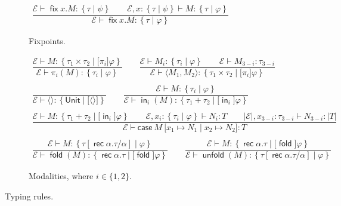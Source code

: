 \documentclass[%
  a4paper,
  UKenglish,
  cleveref,
  autoref,
  thm-restate,
  numberwithinsect,
]{lipics-v2021}
\newcommand\thesis{\vdash}
\newcommand\pair[1]{{\langle #1\rangle}}
\newcommand\copair[1]{{\lbrack #1 \rbrack}}
\newcommand\Env{\mathcal{E}}    %
\newcommand\term[1]{\mathsf{#1}}
\newcommand\type[1]{\term{#1}}
\newcommand\cse{\term{case}}
\newcommand\inj{\mathop{\term{in}}}
\newcommand\fix{\mathop{\term{fix}}}
\newcommand\fold{\mathop{\term{fold}}}
\newcommand\unfold{\mathop{\term{unfold}}}
\newcommand\Unit{\type{Unit}}
\newcommand\rec{\mathop{\type{rec}}}	%
\newcommand\TV{\alpha}		%
\newcommand\reft[1]{\left\{ #1 \right\}}
\newcommand\PT{\tau}		%
\newcommand\RT{T}               %
\newcommand\UPT[1]{\vert #1 \vert}        %
\newcommand\form[1]{\lbrack #1 \rbrack}
\begin{document}
\begin{figure}[t!]
\begin{subfigure}{\textwidth}
\centering
\(
\begin{array}{c}
%
\dfrac{\Env \thesis \fix x.M \colon \reft{\PT \mid \psi}
  \qquad
  \Env, x\colon \reft{\PT \mid \psi} \thesis M \colon \reft{\PT \mid \varphi}}
  {\Env \thesis \fix x.M \colon \reft{\PT \mid \varphi}}
%
\end{array}
\)
\caption{Fixpoints.%
\label{fig:reft:fix}}
\end{subfigure}

\begin{subfigure}{\textwidth}
\centering
\(
\begin{array}{c}
%
\dfrac{\Env \thesis M \colon \reft{\PT_1 \times \PT_2 \mid \form{\pi_i} \varphi}}
  {\Env \thesis \pi_i(M) \colon \reft{\PT_i \mid \varphi}}
%
\qquad
%
\dfrac{\Env \thesis M_i \colon \reft{\PT_i \mid \varphi}
  \qquad
  \Env \thesis M_{3-i} \colon \PT_{3-i}}
  {\Env \thesis \pair{M_1,M_2} \colon \reft{\PT_1 \times \PT_2 \mid \form{\pi_i} \varphi}}
%
\\\\
%
\dfrac{}
  {\Env \thesis \pair{} \colon \reft{\Unit \mid \form{\pair{}}}}
%
\qquad
%
\dfrac{\Env \thesis M \colon \reft{\PT_i \mid \varphi}}
  {\Env \thesis \inj_i(M) \colon \reft{\PT_1 + \PT_2 \mid \form{\inj_i} \varphi}}
%
\\\\
%
\dfrac{
  \Env \thesis M \colon \reft{\PT_1 + \PT_2 \mid \form{\inj_i}\varphi}
  \qquad
  \Env, x_i \colon \reft{\PT_i \mid \varphi} \thesis N_i \colon \RT
  \qquad
  \UPT\Env, x_{3-i} \colon \PT_{3-i} \thesis N_{3-i} \colon \UPT\RT}
  {\Env \thesis \cse\ M\ \copair{x_1 \mapsto N_1 \mid x_2 \mapsto N_2} \colon \RT}
%
\\\\
%
\dfrac{\Env \thesis M \colon \reft{\PT[\rec\TV.\PT/\TV] \mid \varphi}}
  {\Env \thesis \fold(M) \colon \reft{\rec\TV.\PT \mid \form\fold \varphi}}
%
\qquad
%
\dfrac{\Env \thesis M \colon \reft{\rec\TV.\PT \mid \form\fold \varphi}}
  {\Env \thesis \unfold(M) \colon \reft{\PT[\rec\TV.\PT/\TV] \mid \varphi}}
%
\end{array}
\)
\caption{Modalities, where $i \in \{1,2\}$.%
\label{fig:reft:mod}}
\end{subfigure}

\caption{Typing rules.%
\label{fig:reft:reftyping}}
\end{figure}
\end{document}
